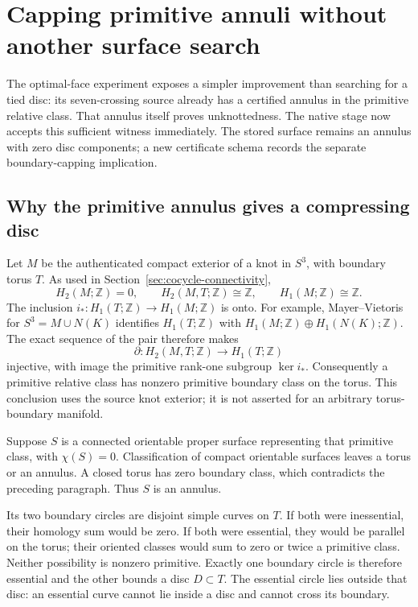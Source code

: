 \section{Capping primitive annuli without another surface search}
\label{sec:cocycle-annulus}

The optimal-face experiment exposes a simpler improvement than searching
for a tied disc: its seven-crossing source already has a certified annulus
in the primitive relative class. That annulus itself proves unknottedness.
The native stage now accepts this sufficient witness immediately. The
stored surface remains an annulus with zero disc components; a new
certificate schema records the separate boundary-capping implication.

\subsection{Why the primitive annulus gives a compressing disc}

Let $M$ be the authenticated compact exterior of a knot in $S^3$, with
boundary torus $T$. As used in Section~\ref{sec:cocycle-connectivity},
\[
 H_2(M;\mathbb Z)=0,\qquad H_2(M,T;\mathbb Z)\cong\mathbb Z,
 \qquad H_1(M;\mathbb Z)\cong\mathbb Z.
\]
The inclusion $i_*:H_1(T;\mathbb Z)\to H_1(M;\mathbb Z)$ is onto.
For example, Mayer--Vietoris for $S^3=M\cup N(K)$ identifies
$H_1(T;\mathbb Z)$ with $H_1(M;\mathbb Z)\oplus H_1(N(K);\mathbb Z)$.
The exact sequence of the pair therefore makes
\[
 \partial:H_2(M,T;\mathbb Z)\longrightarrow H_1(T;\mathbb Z)
\]
injective, with image the primitive rank-one subgroup $\ker i_*$.
Consequently a primitive relative class has nonzero primitive boundary
class on the torus. This conclusion uses the source knot exterior; it is
not asserted for an arbitrary torus-boundary manifold.

Suppose $S$ is a connected orientable proper surface representing that
primitive class, with $\chi(S)=0$. Classification of compact orientable
surfaces leaves a torus or an annulus. A closed torus has zero boundary
class, which contradicts the preceding paragraph. Thus $S$ is an annulus.

Its two boundary circles are disjoint simple curves on $T$. If both were
inessential, their homology sum would be zero. If both were essential,
they would be parallel on the torus; their oriented classes would sum to
zero or twice a primitive class. Neither possibility is nonzero primitive.
Exactly one boundary circle is therefore essential and the other bounds
a disc $D\subset T$. The essential circle lies outside that disc: an
essential curve cannot lie inside a disc and cannot cross its boundary.

